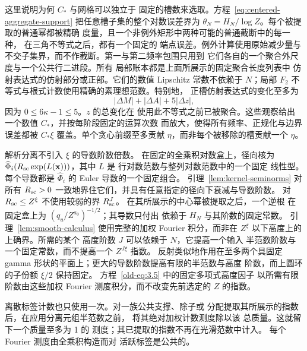 \documentclass[11pt,a4paper]{article}
\numberwithin{equation}{section}
\numberwithin{figure}{section}
\theoremstyle{definition}
\theoremstyle{remark}
\begin{document}
这里说明为何 \(C_*\) 与网格可以独立于
固定的槽数来选取。方程~\eqref{eq:centered-aggregate-support}
把任意槽子集的整个对数误差界为
\(\theta_N=H_N/\log Z\)。每个被提取的普通幂都被精确
度量，且一个非例外矩形中两种可能的普通截断中的每一种，
在三角不等式之后，都有一个固定的
端点误差。例外计算使用原始减少量与
不交子集界，而不作截断。第一与第二频率包围只用到
它们各自的一个聚合外尺度与一个公共行二进段。所有
局部账本都是上面所展示的固定聚合长度列表中
仿射表达式的仿射部分或正部。它们的数值
Lipschitz 常数不依赖于 \(N\)；局部 \(F_2\)
不等式与根式计数使用精确的素理想范数。特别地，
正槽仿射表达式的变化至多为
\begin{equation}
 |\Delta M|+|\Delta A|+5|\Delta z|,
 \label{old-eq:2.1j}
\end{equation}
因为 \(0\le6\kappa-1\le5\)。\(z\) 的总变化在
使用此不等式之前已被聚合。这些观察给出
一个数值 \(C_*\)，并按每阶段固定的运算次数
而放大，使得所有频率、正规化与边界
误差都被 \(C_*\xi\) 覆盖。单个贪心前缀至多贡献
\(\eta\)，而非每个被移除的槽贡献一个 \(\eta\)。

解析分离不引入 \(\xi\) 的导数阶数倍数。
在固定的全乘积对数盒上，径向核为
\(\widehat\Phi_i(R_{\rm sc}\exp(L(\mathbf x)))\)，其中 \(L\) 是
行对数范数与整列对数范数中的一个固定
线性型。每个导数都是 \(\widehat\Phi_i\) 的 Euler 导数的一个固定组合。
引理~\ref{lem:kernel-seminorms} 对所有
\(R_{\rm sc}>0\) 一致地界住它们，并具有任意指定的径向下衰减与导数阶数。
对 \(R_{\rm sc}\le Z^\xi\) 不使用较弱的界 \(R_{\rm sc}^J\)。
在其所展示的中心幂被提取之后，一个逆根
在固定盒上为 \((q_u/Z^{a_0})^{-1/2}\)；其导数只付出
依赖于 \(H_N\) 与其阶数的固定常数。
引理~\ref{lem:smooth-calculus} 使用完整的加权 Fourier
积分，而非在 \(Z^\xi\) 以下高度上的上确界。所需的某个
高度阶数 \(J\) 可以依赖于 \(N\)，它提高一个输入
半范数阶数与一个固定常数，而不提高一个 \(Z^{J\xi}\) 指数。
反射类似地作用在至多两个具固定 gamma
形状的平面上；更大的导数阶数提高有限的半范数与高度
阶数，而上圆环的子份额 \(\xi/2\) 保持固定。
方程~\eqref{old-eq:3.5} 中的固定多项式高度因子
以所需有限阶数由这些加权 Fourier 测度积分，而不改变先前选定的 \(Z\) 的指数。

离散标签计数也只使用一次。对一族公共支撑、除子或
分配提取其所展示的指数后，在应用分离元组半范数之前，
将其绝对加权计数测度除以该
总质量。这就留下一个质量至多为 1 的
测度；其已提取的指数不再在光滑范数中计入。
每个 Fourier 测度由全乘积构造而对
活跃标签是公共的。
\end{document}
